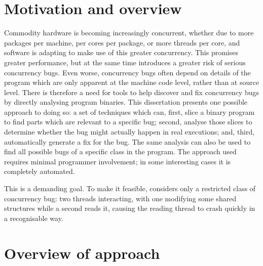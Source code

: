 



\section{Motivation and overview}

Commodity hardware is becoming increasingly concurrent, whether due to
more packages per machine, per cores per package, or more threads per
core, and software is adapting to make use of this greater
concurrency.  This promises greater performance, but at the same time
introduces a greater risk of serious concurrency bugs.  Even worse,
concurrency bugs often depend on details of the program which are only
apparent at the machine code level, rather than at source level.
There is therefore a need for tools to help discover and fix
concurrency bugs by directly analysing program binaries.  This
dissertation presents one possible approach to doing so: a set of
techniques which can, first, slice a binary program to find parts
which are relevant to a specific bug; second, analyse those slices to
determine whether the bug might actually happen in real executions;
and, third, automatically generate a fix for the bug.   The same analysis can also be used to find all possible bugs
of a specific class in the program.  The approach used requires
minimal programmer involvement; in some interesting cases it is
completely automated.

This is a demanding goal.  To make it feasible, {\technique} considers
only a restricted class of concurrency bug: two threads interacting,
with one modifying some shared structures while a second reads it,
causing the reading thread to crash quickly in a recognisable
way.

\section{Overview of approach}
\label{sect:intro:overview}

